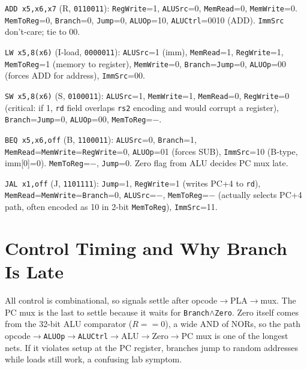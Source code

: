 \texttt{ADD x5,x6,x7} (R, \texttt{0110011}): \texttt{RegWrite}=1, \texttt{ALUSrc}=0, \texttt{MemRead}=0, \texttt{MemWrite}=0. \texttt{MemToReg}=0, \texttt{Branch}=0, \texttt{Jump}=0, \texttt{ALUOp}=10, \texttt{ALUCtrl}=0010 (ADD). \texttt{ImmSrc} don't-care; tie to 00.

\texttt{LW x5,8(x6)} (I-load, \texttt{0000011}): \texttt{ALUSrc}=1 (imm), \texttt{MemRead}=1, \texttt{RegWrite}=1, \texttt{MemToReg}=1 (memory to register), \texttt{MemWrite}=0, \texttt{Branch}=\texttt{Jump}=0, \texttt{ALUOp}=00 (forces ADD for address), \texttt{ImmSrc}=00.

\texttt{SW x5,8(x6)} (S, \texttt{0100011}): \texttt{ALUSrc}=1, \texttt{MemWrite}=1, \texttt{MemRead}=0, \texttt{RegWrite}=0 (critical: if 1, \texttt{rd} field overlaps \texttt{rs2} encoding and would corrupt a register), \texttt{Branch}=\texttt{Jump}=0, \texttt{ALUOp}=00, \texttt{MemToReg}=$-$.

\texttt{BEQ x5,x6,off} (B, \texttt{1100011}): \texttt{ALUSrc}=0, \texttt{Branch}=1, \texttt{MemRead}=\texttt{MemWrite}=\texttt{RegWrite}=0, \texttt{ALUOp}=01 (forces SUB), \texttt{ImmSrc}=10 (B-type, imm[0]=0). \texttt{MemToReg}=$-$, \texttt{Jump}=0. Zero flag from ALU decides PC mux late.

\texttt{JAL x1,off} (J, \texttt{1101111}): \texttt{Jump}=1, \texttt{RegWrite}=1 (writes PC+4 to \texttt{rd}), \texttt{MemRead}=\texttt{MemWrite}=\texttt{Branch}=0, \texttt{ALUSrc}=$-$, \texttt{MemToReg}=$-$ (actually selects PC+4 path, often encoded as 10 in 2-bit \texttt{MemToReg}), \texttt{ImmSrc}=11.

\section{Control Timing and Why Branch Is Late}
All control is combinational, so signals settle after opcode$\to$PLA$\to$mux. The PC mux is the last to settle because it waits for \texttt{Branch}$\land$\texttt{Zero}. Zero itself comes from the 32-bit ALU comparator ($R==0$), a wide AND of NORs, so the path opcode$\to$\texttt{ALUOp}$\to$\texttt{ALUCtrl}$\to$ALU$\to$Zero$\to$PC mux is one of the longest nets. If it violates setup at the PC register, branches jump to random addresses while loads still work, a confusing lab symptom.


